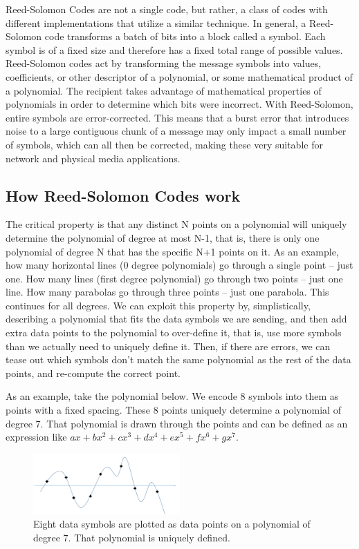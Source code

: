 \documentclass[12pt]{article}
\begin{document}
Reed-Solomon Codes are not a single code, but rather, a class of codes with different implementations that utilize a similar technique. In general, a Reed-Solomon code transforms a batch of bits into a block called a symbol. Each symbol is of a fixed size and therefore has a fixed total range of possible values. Reed-Solomon codes act by transforming the message symbols into values, coefficients, or other descriptor of a polynomial, or some mathematical product of a polynomial. The recipient takes advantage of mathematical properties of polynomials in order to determine which bits were incorrect. With Reed-Solomon, entire symbols are error-corrected. This means that a burst error that introduces noise to a large contiguous chunk of a message may only impact a small number of symbols, which can all then be corrected, making these very suitable for network and physical media applications. \cite{pless}

\subsection{How Reed-Solomon Codes work}

The critical property is that any distinct N points on a polynomial will uniquely determine the polynomial of degree at most N-1, that is, there is only one polynomial of degree N that has the specific N+1 points on it. As an example, how many horizontal lines (0 degree polynomials) go through a single point -- just one. How many lines (first degree polynomial) go through two points -- just one line. How many parabolas go through three points -- just one parabola. This continues for all degrees. We can exploit this property by, simplistically, describing a polynomial that fits the data symbols we are sending, and then add extra data points to the polynomial to over-define it, that is, use more symbols than we actually need to uniquely define it. Then, if there are errors, we can tease out which symbols don't match the same polynomial as the rest of the data points, and re-compute the correct point. \cite{tanenbaum}

As an example, take the polynomial below. We encode 8 symbols into them as points with a fixed spacing. These 8 points uniquely determine a polynomial of degree 7. That polynomial is drawn through the points and can be defined as an expression like $ax + bx^2 + cx^3 + dx^4 + ex^5 + fx^6 + gx^7$.

\begin{figure}[h!]
 \centering
 \includegraphics[width=0.5\textwidth]{img/poly1.png}
 \caption{Eight data symbols are plotted as data points on a polynomial of degree 7. That polynomial is uniquely defined.}
 \label{fig:poly1}
 \end{figure}
\end{document}
